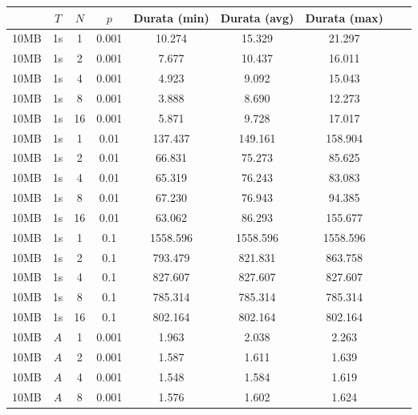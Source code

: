 \begin{figure}[H]
    \centering
    \begin{tabular}{|c|c|c|c|c|c|c|c|c|}
        \hline
        \rowcolor{tblhdrcolor}
        \multicolumn{1}{|c|}{\textbf{Dimensione File}}
                       & \multicolumn{1}{|c|}{\textbf{$T$}}
                       & \multicolumn{1}{|c|}{\textbf{$N$}}
                       & \multicolumn{1}{|c|}{\textbf{$p$}}
                       & \multicolumn{1}{|c|}{\textbf{Durata (min)}}
                       & \multicolumn{1}{|c|}{\textbf{Durata (avg)}}
                       & \multicolumn{1}{|c|}{\textbf{Durata (max)}}
        \\\hline
        10MB & 1s & 1 & 0.001 & 10.274 & 15.329 & 21.297\\\hline
        10MB & 1s & 2 & 0.001 & 7.677 & 10.437 & 16.011\\\hline
        10MB & 1s & 4 & 0.001 & 4.923 & 9.092 & 15.043\\\hline
        10MB & 1s & 8 & 0.001 & 3.888 & 8.690 & 12.273\\\hline
        10MB & 1s & 16 & 0.001 & 5.871 & 9.728 & 17.017\\\hline
        10MB & 1s & 1 & 0.01 & 137.437 & 149.161 & 158.904\\\hline
        10MB & 1s & 2 & 0.01 & 66.831 & 75.273 & 85.625\\\hline
        10MB & 1s & 4 & 0.01 & 65.319 & 76.243 & 83.083\\\hline
        10MB & 1s & 8 & 0.01 & 67.230 & 76.943 & 94.385\\\hline
        10MB & 1s & 16 & 0.01 & 63.062 & 86.293 & 155.677\\\hline
        10MB & 1s & 1 & 0.1 & 1558.596 & 1558.596 & 1558.596\\\hline
        10MB & 1s & 2 & 0.1 & 793.479 & 821.831 & 863.758\\\hline
        10MB & 1s & 4 & 0.1 & 827.607 & 827.607 & 827.607\\\hline
        10MB & 1s & 8 & 0.1 & 785.314 & 785.314 & 785.314\\\hline
        10MB & 1s & 16 & 0.1 & 802.164 & 802.164 & 802.164\\\hline
        10MB & $A$ & 1 & 0.001 & 1.963 & 2.038 & 2.263\\\hline
        10MB & $A$ & 2 & 0.001 & 1.587 & 1.611 & 1.639\\\hline
        10MB & $A$ & 4 & 0.001 & 1.548 & 1.584 & 1.619\\\hline
        10MB & $A$ & 8 & 0.001 & 1.576 & 1.602 & 1.624\\\hline

\end{tabular}
\end{figure}
